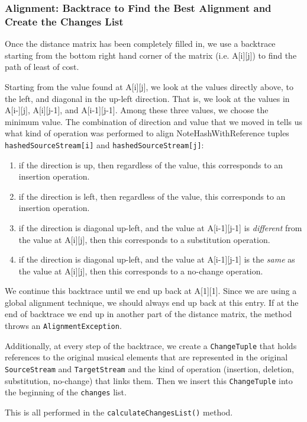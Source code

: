 \subsubsection{Alignment: Backtrace to Find the Best Alignment and Create the Changes List}
Once the distance matrix has been completely filled in, we use a backtrace starting from the bottom right hand corner of the matrix (i.e. A[i][j]) to find the path of least of cost. 

Starting from the value found at A[i][j], we look at the values directly above, to the left, and diagonal in the up-left direction. That is, we look at the values in A[i-][j], A[i][j-1], and A[i-1][j-1]. Among these three values, we choose the minimum value. The combination of direction and value that we moved in tells us what kind of operation was performed to align NoteHashWithReference tuples \texttt{hashedSourceStream[i]} and \texttt{hashedSourceStream[j]}:
\begin{enumerate}
\item if the direction is up, then regardless of the value, this corresponds to an insertion operation.
\item if the direction is left, then regardless of the value, this corresponds to an insertion operation.
\item if the direction is diagonal up-left, and the value at A[i-1][j-1] is \textit{different} from the value at A[i][j], then this corresponds to a substitution operation.
\item if the direction is diagonal up-left, and the value at A[i-1][j-1] is the \textit{same} as the value at A[i][j], then this corresponds to a no-change operation.
\end{enumerate}  

We continue this backtrace until we end up back at A[1][1]. Since we are using a global alignment technique, we should always end up back at this entry. If at the end of backtrace we end up in another part of the distance matrix, the method throws an \texttt{AlignmentException}. 

Additionally, at every step of the backtrace, we create a \texttt{ChangeTuple} that holds references to the original musical elements that are represented in the original \texttt{SourceStream} and \texttt{TargetStream} and the kind of operation (insertion, deletion, substitution, no-change) that links them. Then we insert this \texttt{ChangeTuple} into the beginning of the \texttt{changes} list.

This is all performed in the \texttt{calculateChangesList()} method. 

